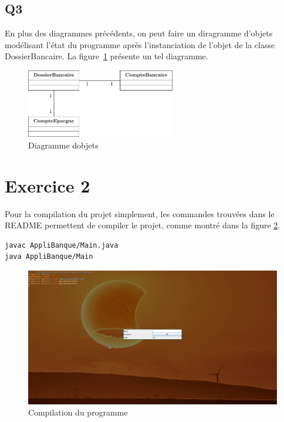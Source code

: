 \documentclass[12pt]{article}
\begin{document}
\subsection{Q3}

En plus des diagrammes précédents, on peut faire un diragramme d'objets modélisant l'état du programme après l'instanciation de l'objet de la classe DossierBancaire.
La figure~\ref{UO1} présente un tel diagramme. 
\begin{figure}[h]
    \centering
    \includegraphics[height=3cm]{Diagrammes/UML_UO1.pdf}
    \caption{Diagramme d\textquotesingle objets\label{UO1}}
\end{figure}

\section{Exercice 2}

Pour la compilation du projet simplement, les commandes trouvées 
dans le README permettent de compiler le projet, comme montré dans la figure \ref{ScreenE2Q31}.

\begin{lstlisting}[language=bash]
javac AppliBanque/Main.java
java AppliBanque/Main
\end{lstlisting}

\begin{figure}[h]
    \centering
    \includegraphics[width=\textwidth]{img/Screenshots/E2_Q3_1.png}
    \caption{Compilation du programme\label{ScreenE2Q31}}
\end{figure}
\end{document}
